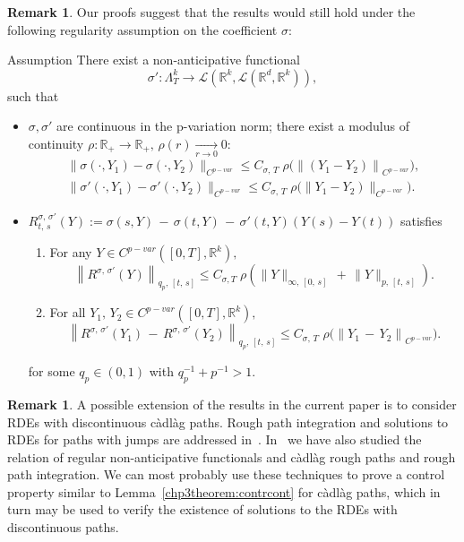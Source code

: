 \documentclass[10pt]{amsart}
\theoremstyle{definition}\newtheorem{defi}[theo]{Definition}\newtheorem{rema}[theo]{Remark}\newtheorem{exam}[theo]{Example}\newtheorem{exem}[theo]{Example}\newtheorem{nota}[theo]{Notation}
\newcommand{\cadlag}{càdlàg }
\newcommand{\calL}{\mathcal{L}}
\newcommand{\Rr}{{\mathbb{R}}}
\newcommand*{\alphenumi}{\renewcommand*{\theenumi}{\alph{enumi}}}
\begin{document}
\begin{rema}
Our proofs suggest that the results would still hold under the following regularity assumption on the coefficient $\sigma$:
\end{rema}

\begin{enonce}{Assumption}
There exist a non-anticipative functional
\[
\sigma'\colon\Lambda^k_T\to \calL\left(\Rr^k,\calL\left(\Rr^d,\Rr^k\right)\right),
\]
such that
\begin{itemize}
\item $\sigma, \sigma'$ are continuous in the p-variation norm; there exist a modulus of continuity $\rho\colon \Rr_+\to \Rr_+,\, \rho(r)\xrightarrow[r\to 0]{} 0$:
\begin{align*}
\big\|\sigma\left(\cdot, Y_1\right)-\sigma\left(\cdot, Y_2\right)\big\|_{{C}^{p-var}}\leq C_{\sigma,\,T}\;\rho \big(\left\|\left(Y_1- Y_2\right)\right\|_{{C}^{p-var}}\big),\\
\big\|\sigma'\left(\cdot, Y_1\right)-\sigma'\left(\cdot, Y_2\right)\big\|_{{C}^{p-var}}\leq C_{\sigma,\,T}\;\rho \big(\left\| Y_1- Y_2\right)\|_{{C}^{p-var}} \big).
\end{align*}

\item $R^{\sigma,\,\sigma'}_{t,\,s}(Y):=\sigma(s, Y)\,-\,\sigma(t, Y)\,-\,\sigma'(t,Y)(Y(s)-Y(t))$ satisfies
\begin{enumerate}\alphenumi
\item For any $Y\in C^{p-var}([0,T], \Rr^k),$
\[
\left\|R^{\sigma,\,\sigma'}(Y)\right\|_{q_p,\,[t,\,s]}\leq C_{\sigma, T}\; \rho\left(\|Y\|_{\infty,\,[0,\,s]}\,+\,\|Y\|_{p,\,[t,\,s]}\right).
\]

\item For all $Y_1,\, Y_2\in C^{p-var}([0,T], \Rr^k),$
\[
\left\|R^{\sigma,\,\sigma'}(Y_1)\,-\,R^{\sigma, \,\sigma'}(Y_2)\right\|_{q_p,\,[t,\,s]}\leq C_{\sigma,\,T}\,\, \rho\big(\left\|Y_1\,-\,Y_2\right\|_{{C}^{p-var}}\big).
\]
\end{enumerate}
for some $q_{p}\in (0,1)$ with $q_{p}^{-1}+p^{-1}>1$.
\end{itemize}
\end{enonce}


\begin{rema}
A possible extension of the results in the current paper is to consider RDEs with discontinuous \cadlag paths. Rough path integration and solutions to RDEs for paths with jumps are addressed in~\cite{FritzShekhar,FrizZhang}. In~\cite{Anna} we have also studied the relation of regular non-anticipative functionals and \cadlag rough paths and rough path integration. We can most probably use these techniques to prove a control property similar to Lemma~\ref{chp3theorem:contrcont} for \cadlag paths, which in turn may be used to verify the existence of solutions to the RDEs with discontinuous paths.
\end{rema}
\end{document}
